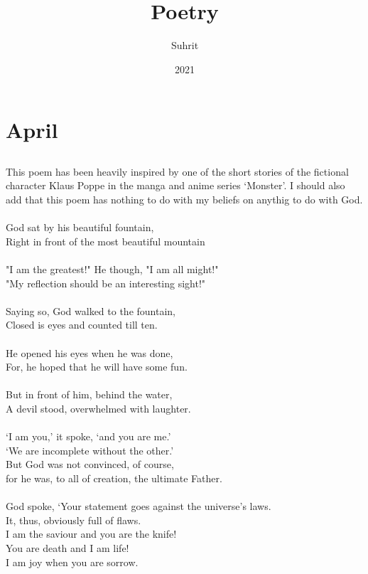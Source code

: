 \documentclass{Report}
\title{Poetry}
\author{Suhrit}
\date{2021}
\begin{document}
\maketitle
\chapter*{April}
\section*{ }
This poem has been heavily inspired by one of the short stories of the fictional character Klaus Poppe in the manga and anime series `Monster'. I should also add that this poem has nothing to do with my beliefs on anythig to do with God.
\\
\\God sat by his beautiful fountain,
\\Right in front of the most beautiful mountain
\\
\\"I am the greatest!" He though, "I am all might!"
\\"My reflection should be an interesting sight!"
\\
\\Saying so, God walked to the fountain,
\\Closed is eyes and counted till ten.
\\
\\He opened his eyes when he was done,
\\For, he hoped that he will have some fun.
\\
\\But in front of him, behind the water,
\\A devil stood, overwhelmed with laughter.
\\
\\`I am you,' it spoke, `and you are me.'
\\`We are incomplete without the other.'
\\But God was not convinced, of course,
\\for he was, to all of creation, the ultimate Father.
\\
\\God spoke, `Your statement goes against the universe's laws.
\\It, thus, obviously full of flaws.
\\I am the saviour and you are the knife!
\\You are death and I am life!
\\I am joy when you are sorrow.
\end{document}
